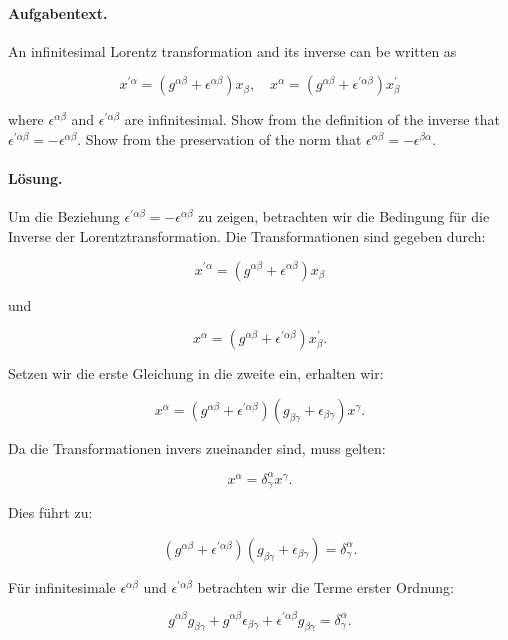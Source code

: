 \documentclass[11pt,a4paper]{article}
\begin{document}
\paragraph{Aufgabentext.}
An infinitesimal Lorentz transformation and its inverse can be written as

$$
x^{\prime \alpha}=\left(g^{\alpha \beta}+\epsilon^{\alpha \beta}\right) x_\beta, \quad x^\alpha=\left(g^{\alpha \beta}+\epsilon^{\prime \alpha \beta}\right) x_\beta^{\prime}
$$

where $\epsilon^{\alpha \beta}$ and $\epsilon^{\prime \alpha \beta}$ are infinitesimal. Show from the definition of the inverse that $\epsilon^{\prime \alpha \beta}=- \epsilon^{\alpha \beta}$. Show from the preservation of the norm that $\epsilon^{\alpha \beta}=-\epsilon^{\beta \alpha}$.

\paragraph{Lösung.}
Um die Beziehung $\epsilon^{\prime \alpha \beta} = - \epsilon^{\alpha \beta}$ zu zeigen, betrachten wir die Bedingung für die Inverse der Lorentztransformation. Die Transformationen sind gegeben durch:

\[
x^{\prime \alpha} = \left(g^{\alpha \beta} + \epsilon^{\alpha \beta}\right) x_\beta
\]

und

\[
x^\alpha = \left(g^{\alpha \beta} + \epsilon^{\prime \alpha \beta}\right) x_\beta^{\prime}.
\]

Setzen wir die erste Gleichung in die zweite ein, erhalten wir:

\[
x^\alpha = \left(g^{\alpha \beta} + \epsilon^{\prime \alpha \beta}\right) \left(g_{\beta \gamma} + \epsilon_{\beta \gamma}\right) x^\gamma.
\]

Da die Transformationen invers zueinander sind, muss gelten:

\[
x^\alpha = \delta^\alpha_\gamma x^\gamma.
\]

Dies führt zu:

\[
\left(g^{\alpha \beta} + \epsilon^{\prime \alpha \beta}\right) \left(g_{\beta \gamma} + \epsilon_{\beta \gamma}\right) = \delta^\alpha_\gamma.
\]

Für infinitesimale $\epsilon^{\alpha \beta}$ und $\epsilon^{\prime \alpha \beta}$ betrachten wir die Terme erster Ordnung:

\[
g^{\alpha \beta} g_{\beta \gamma} + g^{\alpha \beta} \epsilon_{\beta \gamma} + \epsilon^{\prime \alpha \beta} g_{\beta \gamma} = \delta^\alpha_\gamma.
\]
\end{document}
